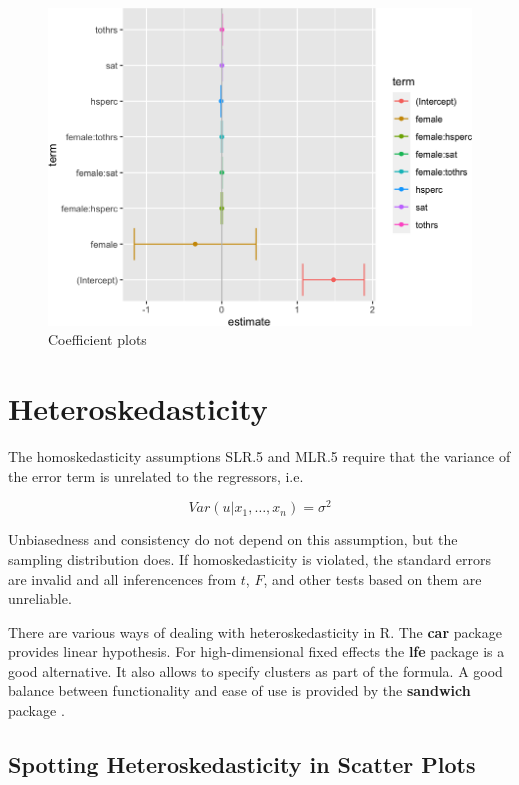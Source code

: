 \documentclass[]{book}
\begin{document}
\begin{figure}

{\centering \includegraphics[width=0.8\linewidth]{MEM5220_R_files/figure-latex/fig17-1} 

}

\caption{Coefficient plots}\label{fig:fig17}
\end{figure}

\hypertarget{heteroskedasticity}{%
\section{Heteroskedasticity}\label{heteroskedasticity}}

The homoskedasticity assumptions SLR.5 and MLR.5 require that the
variance of the error term is unrelated to the regressors, i.e.

\begin{equation}
Var(u|x_1, \dots , x_n) = \sigma^2  
\end{equation}

Unbiasedness and consistency do not depend on this assumption, but the
sampling distribution does. If homoskedasticity is violated, the
standard errors are invalid and all inferencences from \(t\), \(F\), and
other tests based on them are unreliable.

There are various ways of dealing with heteroskedasticity in R. The
\textbf{car} package provides linear hypothesis. For high-dimensional
fixed effects the \textbf{lfe} package is a good alternative. It also
allows to specify clusters as part of the formula. A good balance
between functionality and ease of use is provided by the
\textbf{sandwich} package \citet{Zeileis2017}.

\hypertarget{spotting-heteroskedasticity-in-scatter-plots}{%
\subsection{Spotting Heteroskedasticity in Scatter
Plots}\label{spotting-heteroskedasticity-in-scatter-plots}}
\end{document}
